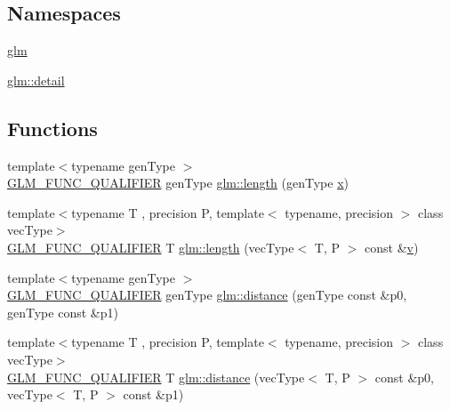 \subsection*{Namespaces}
\begin{DoxyCompactItemize}
\item 
 \mbox{\hyperlink{namespaceglm}{glm}}
\item 
 \mbox{\hyperlink{namespaceglm_1_1detail}{glm\+::detail}}
\end{DoxyCompactItemize}
\subsection*{Functions}
\begin{DoxyCompactItemize}
\item 
{\footnotesize template$<$typename gen\+Type $>$ }\\\mbox{\hyperlink{setup_8hpp_a33fdea6f91c5f834105f7415e2a64407}{G\+L\+M\+\_\+\+F\+U\+N\+C\+\_\+\+Q\+U\+A\+L\+I\+F\+I\+ER}} gen\+Type \mbox{\hyperlink{namespaceglm_abcd8538aa95a8963803ec42c2fd654cd}{glm\+::length}} (gen\+Type \mbox{\hyperlink{glad_8h_a92d0386e5c19fb81ea88c9f99644ab1d}{x}})
\item 
{\footnotesize template$<$typename T , precision P, template$<$ typename, precision $>$ class vec\+Type$>$ }\\\mbox{\hyperlink{setup_8hpp_a33fdea6f91c5f834105f7415e2a64407}{G\+L\+M\+\_\+\+F\+U\+N\+C\+\_\+\+Q\+U\+A\+L\+I\+F\+I\+ER}} T \mbox{\hyperlink{group__core__func__geometric_ga18d45e3d4c7705e67ccfabd99e521604}{glm\+::length}} (vec\+Type$<$ T, P $>$ const \&\mbox{\hyperlink{glad_8h_a14cfbe2fc2234f5504618905b69d1e06}{v}})
\item 
{\footnotesize template$<$typename gen\+Type $>$ }\\\mbox{\hyperlink{setup_8hpp_a33fdea6f91c5f834105f7415e2a64407}{G\+L\+M\+\_\+\+F\+U\+N\+C\+\_\+\+Q\+U\+A\+L\+I\+F\+I\+ER}} gen\+Type \mbox{\hyperlink{namespaceglm_aa7275be4cec4bfcf1c4a7add8f3ee7f4}{glm\+::distance}} (gen\+Type const \&p0, gen\+Type const \&p1)
\item 
{\footnotesize template$<$typename T , precision P, template$<$ typename, precision $>$ class vec\+Type$>$ }\\\mbox{\hyperlink{setup_8hpp_a33fdea6f91c5f834105f7415e2a64407}{G\+L\+M\+\_\+\+F\+U\+N\+C\+\_\+\+Q\+U\+A\+L\+I\+F\+I\+ER}} T \mbox{\hyperlink{group__core__func__geometric_ga7ca317dde0d7e94d920153554d4a02a8}{glm\+::distance}} (vec\+Type$<$ T, P $>$ const \&p0, vec\+Type$<$ T, P $>$ const \&p1)
\item 

\end{DoxyCompactItemize}
